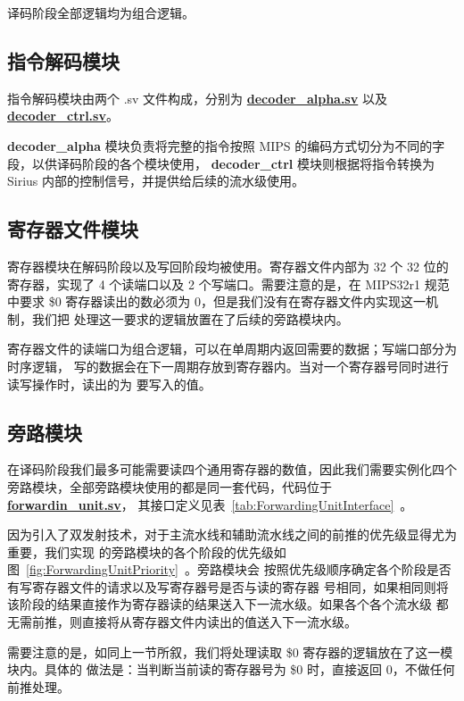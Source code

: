 \documentclass[blue,normal,cn,hide]{elegantbook}
\begin{document}
译码阶段全部逻辑均为组合逻辑。

\subsection{指令解码模块}

指令解码模块由两个 .sv 文件构成，分别为 \href{https://github.com/name1e5s/Sirius/blob/master/decoder\_alpha.sv}{\textbf{decoder\_alpha.sv}}
以及 \href{https://github.com/name1e5s/Sirius/blob/master/decoder\_ctrl.sv}{\textbf{decoder\_ctrl.sv}}。

\textbf{decoder\_alpha} 模块负责将完整的指令按照 MIPS 的编码方式切分为不同的字段，以供译码阶段的各个模块使用，
\textbf{decoder\_ctrl} 模块则根据将指令转换为 Sirius 内部的控制信号，并提供给后续的流水级使用。

\subsection{寄存器文件模块}

寄存器模块在解码阶段以及写回阶段均被使用。寄存器文件内部为 32 个 32 
位的寄存器，实现了 4 个读端口以及 2 个写端口。需要注意的是，在 MIPS32r1 规范中要求
\$0 寄存器读出的数必须为 0，但是我们没有在寄存器文件内实现这一机制，我们把
处理这一要求的逻辑放置在了后续的旁路模块内。

寄存器文件的读端口为组合逻辑，可以在单周期内返回需要的数据；写端口部分为时序逻辑，
写的数据会在下一周期存放到寄存器内。当对一个寄存器号同时进行读写操作时，读出的为
要写入的值。

\subsection{旁路模块}

在译码阶段我们最多可能需要读四个通用寄存器的数值，因此我们需要实例化四个
旁路模块，全部旁路模块使用的都是同一套代码，代码位于 \href{https://github.com/name1e5s/Sirius/blob/master/forwardin\_unit.sv}{\textbf{forwardin\_unit.sv}}，
其接口定义见表~\ref{tab:ForwardingUnitInterface}~。

因为引入了双发射技术，对于主流水线和辅助流水线之间的前推的优先级显得尤为重要，我们实现
的旁路模块的各个阶段的优先级如图~\ref{fig:ForwardingUnitPriority}~。旁路模块会
按照优先级顺序确定各个阶段是否有写寄存器文件的请求以及写寄存器号是否与读的寄存器
号相同，如果相同则将该阶段的结果直接作为寄存器读的结果送入下一流水级。如果各个各个流水级
都无需前推，则直接将从寄存器文件内读出的值送入下一流水级。

需要注意的是，如同上一节所叙，我们将处理读取 \$0 寄存器的逻辑放在了这一模块内。具体的
做法是：当判断当前读的寄存器号为 \$0 时，直接返回 0，不做任何前推处理。
\end{document}
